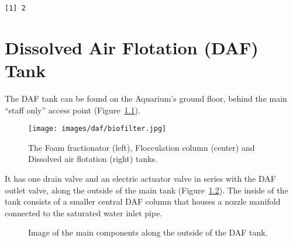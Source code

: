 \documentclass[
  letterpaper,
  DIV=11,
  numbers=noendperiod]{scrreprt}
\begin{document}
\begin{verbatim}
[1] 2
\end{verbatim}

\hypertarget{dissolved-air-flotation-daf-tank}{%
\chapter{Dissolved Air Flotation (DAF)
Tank}\label{dissolved-air-flotation-daf-tank}}

The DAF tank can be found on the Aquarium's ground floor, behind the
main ``staff only'' access point (Figure~\ref{fig-biofilter}).

\begin{figure}[H]

{\centering \texttt{[image: images/daf/biofilter.jpg]}

}

\caption{\label{fig-biofilter}The Foam fractionator (left), Flocculation
column (center) and Dissolved air flotation (right) tanks.}

\end{figure}

It has one drain valve and an electric actuator valve in series with the
DAF outlet valve, along the outside of the main tank
(Figure~\ref{fig-dafcomp}). The inside of the tank consists of a smaller
central DAF column that houses a nozzle manifold connected to the
saturated water inlet pipe.

\begin{figure}[H]

\begin{minipage}[t]{0.50\linewidth}

{\centering 


}

\end{minipage}%
%
\begin{minipage}[t]{0.50\linewidth}

{\centering 


}

\end{minipage}%

\caption{\label{fig-dafcomp}Image of the main components along the
outside of the DAF tank.}

\end{figure}
\end{document}
